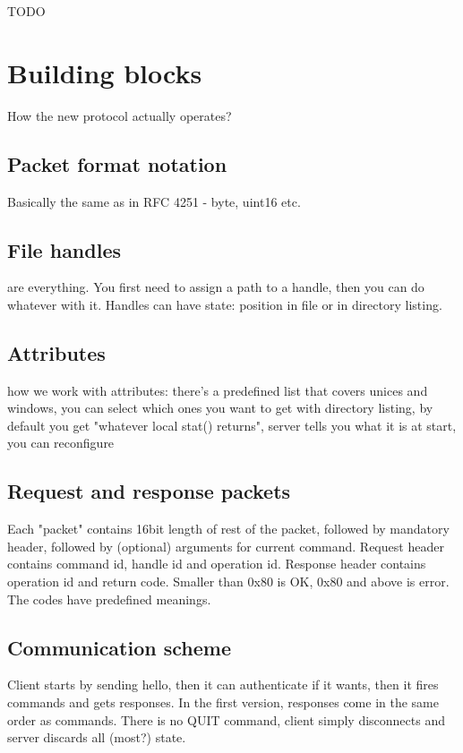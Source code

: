 TODO


\section{Building blocks}

How the new protocol actually operates?

\subsection{Packet format notation}

Basically the same as in RFC 4251 - byte, uint16 etc.

\subsection{File handles}

are everything. You first need to assign a path to a handle, then you can do whatever with it. Handles can
have state: position in file or in directory listing.

\subsection{Attributes}

how we work with attributes: there's a predefined list that covers unices and windows, you can select which
ones you want to get with directory listing, by default you get "whatever local stat() returns", server tells
you what it is at start, you can reconfigure

\subsection{Request and response packets}

Each "packet" contains 16bit length of rest of the packet, followed by mandatory header, followed by
(optional) arguments for current command. Request header contains command id, handle id and operation id.
Response header contains operation id and return code. Smaller than 0x80 is OK, 0x80 and above is error. The
codes have predefined meanings.

\subsection{Communication scheme}

Client starts by sending hello, then it can authenticate if it wants, then it fires commands and gets
responses. In the first version, responses come in the same order as commands. There is no QUIT command,
client simply disconnects and server discards all (most?) state.

